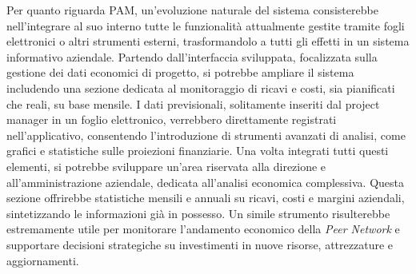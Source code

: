 Per quanto riguarda \ac{PAM}, un’evoluzione naturale del sistema consisterebbe nell’integrare al suo
interno tutte le funzionalità attualmente gestite tramite fogli elettronici o altri strumenti esterni,
trasformandolo a tutti gli effetti in un sistema informativo aziendale.
Partendo dall’interfaccia sviluppata, focalizzata sulla gestione dei dati economici di progetto, si
potrebbe ampliare il sistema includendo una sezione dedicata al monitoraggio di ricavi e costi,
sia pianificati che reali, su base mensile. I dati previsionali, solitamente inseriti dal project manager
in un foglio elettronico, verrebbero direttamente registrati nell’applicativo, consentendo l’introduzione
di strumenti avanzati di analisi, come grafici e statistiche sulle proiezioni finanziarie.
Una volta integrati tutti questi elementi, si potrebbe sviluppare un’area riservata alla direzione e
all’amministrazione aziendale, dedicata all’analisi economica complessiva. Questa sezione offrirebbe
statistiche mensili e annuali su ricavi, costi e margini aziendali, sintetizzando le informazioni già
in possesso. Un simile strumento risulterebbe estremamente utile per monitorare l’andamento economico
della \textit{Peer Network} e supportare decisioni strategiche su investimenti in nuove risorse,
attrezzature e aggiornamenti.